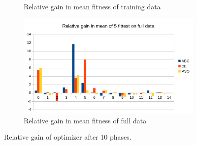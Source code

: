 \begin{figure}
\begin{subfigure}{0.6\textwidth}
        \caption{Relative gain in mean fitness of training data}
    \end{subfigure}%
    \begin{subfigure}{0.6\textwidth}
    \centering
        \includegraphics[width=0.8\linewidth]{figures/hybrid_phases10_meanfullfitness.png}
        \caption{Relative gain in mean fitness of full data}
    \end{subfigure}
    \caption{Relative gain of optimizer after 10 phases.}
    \label{fig:10phase}
    \end{figure}

